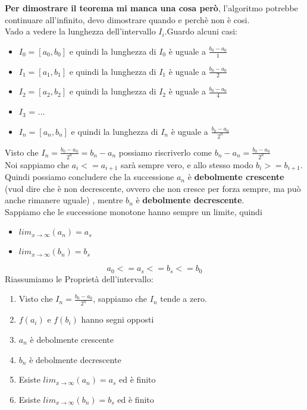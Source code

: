 \documentclass[11pt]{article}
\begin{document}
\textbf{Per dimostrare il teorema mi manca una cosa però}, l'algoritmo potrebbe continuare all'infinito, 
devo dimostrare quando e perchè non è cosi.\\
Vado a vedere la lunghezza dell'intervallo $I_{i}$.Guardo alcuni casi:
\begin{itemize}
    \item $I_{0} = [a_{0},b_{0}]$ e quindi la lunghezza di $I_{0}$ è uguale a $\frac{b_{0} - a_{0}}{1}$
    \item $I_{1} = [a_{1},b_{1}]$ e quindi la lunghezza di $I_{1}$ è uguale a $\frac{b_{0} - a_{0}}{2}$
    \item $I_{2} = [a_{2},b_{2}]$ e quindi la lunghezza di $I_{2}$ è uguale a $\frac{b_{0} - a_{0}}{4}$
    \item $I_{3}$ = ...
    \item $I_{n} = [a_{n},b_{n}]$ e quindi la lunghezza di $I_{n}$ è uguale a $\frac{b_{0} - a_{0}}{2^{n}}$
\end{itemize}
Visto che $I_{n} = \frac{b_{0} - a_{0}}{2^{n}} = b_{n} - a_{n}$ possiamo riscriverlo come $b_{n} - a_{n} = \frac{b_{0} - a_{0}}{2^{n}}$\\
Noi sappiamo che $a_{i} <= a_{i+1}$ sarà sempre vero, e allo stesso modo $b_{i} >= b_{i+1}$. Quindi possiamo concludere che 
la successione $a_{n}$ è \textbf{debolmente crescente} (vuol dire che è non decrescente, ovvero che non cresce per forza sempre, ma può anche rimanere uguale)
, mentre $b_{n}$ è \textbf{debolmente decrescente}.\\
Sappiamo che le successione monotone hanno sempre un limite, quindi
\begin{itemize}
    \item $lim_{x \rightarrow \infty}(a_{n}) = a_{s}$
    \item $lim_{x \rightarrow \infty}(b_{n}) = b_{s}$
\end{itemize}
$$a_{0} <= a_{s} <= b_{s} <= b_{0}$$
Riassumiamo le Proprietà dell'intervallo:
\begin{enumerate}
    \item Visto che $I_{n} = \frac{b_{0} - a_{0}}{2^{n}}$, sappiamo che $I_{n}$ tende a zero.
    \item $f(a_{i})$ e $f(b_{i})$ hanno segni opposti
    \item $a_{n}$ è debolmente crescente
    \item $b_{n}$ è debolmente decrescente
    \item Esiste $lim_{x \rightarrow \infty}(a_{n}) = a_{s}$ ed è finito
    \item Esiste $lim_{x \rightarrow \infty}(b_{n}) = b_{s}$ ed è finito
\end{enumerate}
\end{document}
